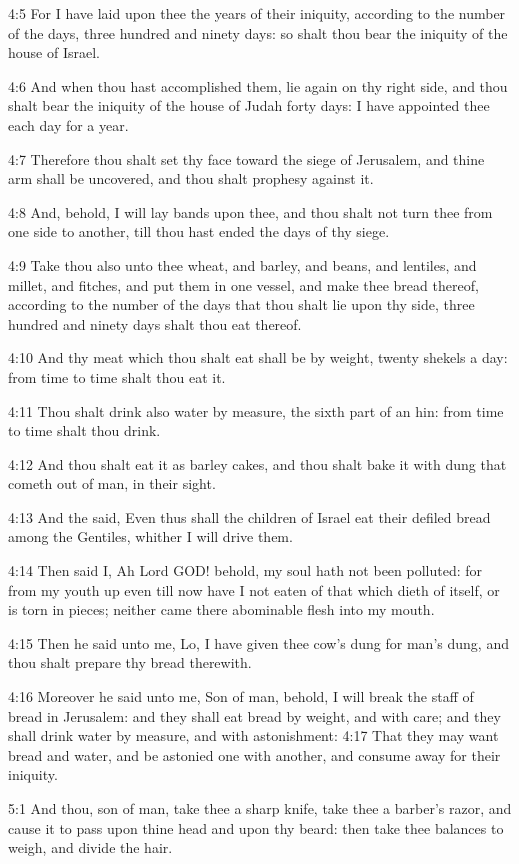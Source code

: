 4:5 For I have laid upon thee the years of their iniquity, according
to the number of the days, three hundred and ninety days: so shalt
thou bear the iniquity of the house of Israel.

4:6 And when thou hast accomplished them, lie again on thy right side,
and thou shalt bear the iniquity of the house of Judah forty days: I
have appointed thee each day for a year.

4:7 Therefore thou shalt set thy face toward the siege of Jerusalem,
and thine arm shall be uncovered, and thou shalt prophesy against it.

4:8 And, behold, I will lay bands upon thee, and thou shalt not turn
thee from one side to another, till thou hast ended the days of thy
siege.

4:9 Take thou also unto thee wheat, and barley, and beans, and
lentiles, and millet, and fitches, and put them in one vessel, and
make thee bread thereof, according to the number of the days that thou
shalt lie upon thy side, three hundred and ninety days shalt thou eat
thereof.

4:10 And thy meat which thou shalt eat shall be by weight, twenty
shekels a day: from time to time shalt thou eat it.

4:11 Thou shalt drink also water by measure, the sixth part of an hin:
from time to time shalt thou drink.

4:12 And thou shalt eat it as barley cakes, and thou shalt bake it
with dung that cometh out of man, in their sight.

4:13 And the \LORD said, Even thus shall the children of Israel eat
their defiled bread among the Gentiles, whither I will drive them.

4:14 Then said I, Ah Lord GOD! behold, my soul hath not been polluted:
for from my youth up even till now have I not eaten of that which
dieth of itself, or is torn in pieces; neither came there abominable
flesh into my mouth.

4:15 Then he said unto me, Lo, I have given thee cow's dung for man's
dung, and thou shalt prepare thy bread therewith.

4:16 Moreover he said unto me, Son of man, behold, I will break the
staff of bread in Jerusalem: and they shall eat bread by weight, and
with care; and they shall drink water by measure, and with
astonishment: 4:17 That they may want bread and water, and be astonied
one with another, and consume away for their iniquity.

5:1 And thou, son of man, take thee a sharp knife, take thee a
barber's razor, and cause it to pass upon thine head and upon thy
beard: then take thee balances to weigh, and divide the hair.

